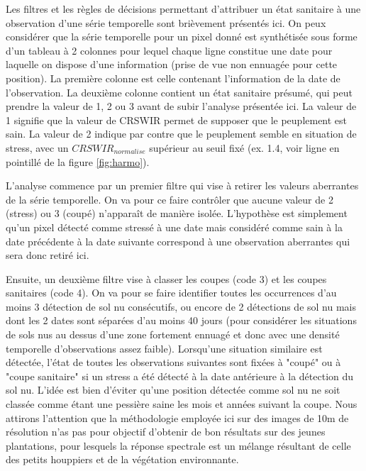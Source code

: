 \documentclass[a4paper, 12pt]{article} %
\begin{document}
Les filtres et les règles de décisions permettant d'attribuer un état sanitaire à une observation d'une série temporelle sont brièvement présentés ici. On peux considérer que la série temporelle pour un pixel donné est synthétisée sous forme d'un tableau à 2 colonnes pour lequel chaque ligne constitue une date pour laquelle on dispose d'une information (prise de vue non ennuagée pour cette position). La première colonne est celle contenant l'information de la date de l'observation. La deuxième colonne contient un état sanitaire présumé, qui peut prendre la valeur de 1, 2 ou 3 avant de subir l'analyse présentée ici. La valeur de 1 signifie que la valeur de CRSWIR permet de supposer que le peuplement est sain. La valeur de 2 indique par contre que le peuplement semble en situation de stress, avec un $CRSWIR_{normalise}$ supérieur au seuil fixé (ex. 1.4, voir ligne en pointillé de la figure \ref{fig:harmo}).

L'analyse commence par un premier filtre qui vise à retirer les valeurs aberrantes de la série temporelle. On va pour ce faire contrôler que aucune valeur de 2 (stress) ou 3 (coupé) n'apparaît de manière isolée. L'hypothèse est simplement qu'un pixel détecté comme stressé à une date mais considéré comme sain à la date précédente à la date suivante correspond à une observation aberrantes qui sera donc retiré ici.

Ensuite, un deuxième filtre vise à classer les coupes (code 3) et les coupes sanitaires (code 4). On va pour se faire identifier toutes les occurrences d'au moins 3 détection de sol nu consécutifs, ou encore de 2 détections de sol nu mais dont les 2 dates sont séparées d'au moins 40 jours (pour considérer les situations de sols nus au dessus d'une zone fortement ennuagé et donc avec une densité temporelle d'observations assez faible). Lorsqu'une situation similaire est détectée, l'état de toutes les observations suivantes sont fixées à "coupé" ou à "coupe sanitaire" si un stress a été détecté à la date antérieure à la détection du sol nu. L'idée est bien d'éviter qu'une position détectée comme sol nu ne soit classée comme étant une pessière saine les mois et années suivant la coupe. Nous attirons l'attention que la méthodologie employée ici sur des images de 10m de résolution n'as pas pour objectif d'obtenir de bon résultats sur des jeunes plantations, pour lesquels la réponse spectrale est un mélange résultant de celle des petits houppiers et de la végétation environnante.
\end{document}
